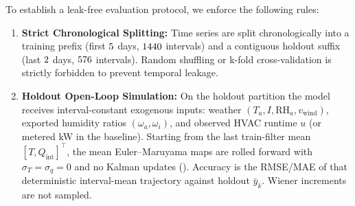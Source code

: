 \documentclass[11pt,letterpaper]{article}
\begin{document}
To establish a leak-free evaluation protocol, we enforce the following rules:
\begin{enumerate}
\item \textbf{Strict Chronological Splitting:} Time series are split chronologically into a training prefix (first $5$ days, $1440$ intervals) and a contiguous holdout suffix (last $2$ days, $576$ intervals). Random shuffling or k-fold cross-validation is strictly forbidden to prevent temporal leakage.
\item \textbf{Holdout Open-Loop Simulation:} On the holdout partition the model receives interval-constant exogenous inputs: weather $(T_a, I, \mathrm{RH}_a, v_\mathrm{wind})$, exported humidity ratios $(\omega_a,\omega_i)$, and observed HVAC runtime $u$ (or metered kW in the baseline). Starting from the last train-filter mean $[T, Q_\mathrm{int}]^\top$, the mean Euler--Maruyama maps are rolled forward with $\sigma_T=\sigma_q=0$ and no Kalman updates (). Accuracy is the RMSE/MAE of that deterministic interval-mean trajectory against holdout $\bar{y}_k$. Wiener increments are not sampled.
\end{enumerate}
\end{document}
